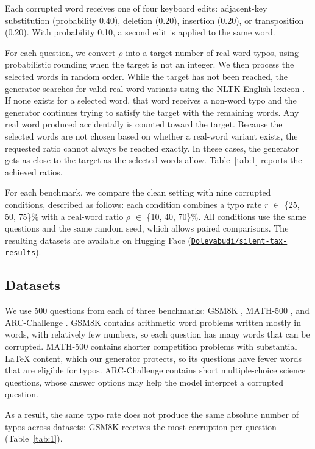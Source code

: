 \documentclass[11pt]{article}
\begin{document}
Each corrupted word receives one of four keyboard edits: adjacent-key substitution (probability 0.40), deletion (0.20), insertion (0.20), or transposition (0.20). With probability 0.10, a second edit is applied to the same word.

For each question, we convert $\rho$ into a target number of real-word typos, using probabilistic rounding when the target is not an integer. We then process the selected words in random order. While the target has not been reached, the generator searches for valid real-word variants using the NLTK English lexicon \citep{bird2009}. If none exists for a selected word, that word receives a non-word typo and the generator continues trying to satisfy the target with the remaining words. Any real word produced accidentally is counted toward the target. Because the selected words are not chosen based on whether a real-word variant exists, the requested ratio cannot always be reached exactly. In these cases, the generator gets as close to the target as the selected words allow. Table~\ref{tab:1} reports the achieved ratios.

For each benchmark, we compare the clean setting with nine corrupted conditions, described as follows: each condition combines a typo rate $r$ $\in$ \{25, 50, 75\}\% with a real-word ratio $\rho$ $\in$ \{10, 40, 70\}\%. All conditions use the same questions and the same random seed, which allows paired comparisons. The resulting datasets are available on Hugging Face (\href{https://huggingface.co/datasets/Dolevabudi/silent-tax-results}{\nolinkurl{Dolevabudi/silent-tax-results}}).


\subsection{Datasets}

We use 500 questions from each of three benchmarks: GSM8K \citep{cobbe2021}, MATH-500 \citep{hendrycks2021,lightman2024}, and ARC-Challenge \citep{clark2018}. GSM8K contains arithmetic word problems written mostly in words, with relatively few numbers, so each question has many words that can be corrupted. MATH-500 contains shorter competition problems with substantial LaTeX content, which our generator protects, so its questions have fewer words that are eligible for typos. ARC-Challenge contains short multiple-choice science questions, whose answer options may help the model interpret a corrupted question.

As a result, the same typo rate does not produce the same absolute number of typos across datasets: GSM8K receives the most corruption per question (Table~\ref{tab:1}).
\end{document}
